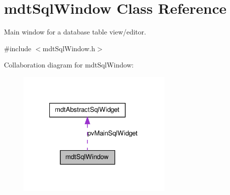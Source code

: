 \hypertarget{classmdt_sql_window}{
\section{mdtSqlWindow Class Reference}
\label{classmdt_sql_window}
}


Main window for a database table view/editor.  




{\ttfamily \#include $<$mdtSqlWindow.h$>$}



Collaboration diagram for mdtSqlWindow:
\nopagebreak
\begin{figure}[H]
\begin{center}
\leavevmode
\includegraphics[width=214pt]{classmdt_sql_window__coll__graph}
\end{center}
\end{figure}

